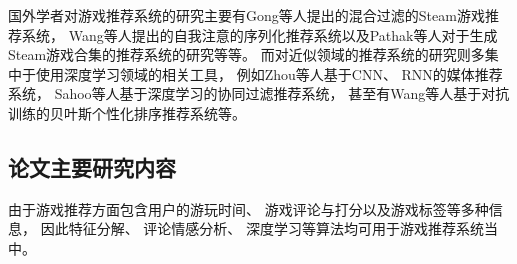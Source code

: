 国外学者对游戏推荐系统的研究主要有Gong等人\cite{gongHybridRecommenderSystem2020}提出的混合过滤的Steam游戏推荐系统，
Wang\cite{kangSelfAttentiveSequentialRecommendation2018}等人提出的自我注意的序列化推荐系统以及Pathak\cite{pathakGeneratingPersonalizingBundle2017}等人对于生成Steam游戏合集的推荐系统的研究等等。
而对近似领域的推荐系统的研究则多集中于使用深度学习领域的相关工具，
例如Zhou\cite{zhouCNNRNNBasedIntelligent2021}等人基于CNN、
RNN的媒体推荐系统，
Sahoo\cite{sahooDeepRecoDeepLearning2019}等人基于深度学习的协同过滤推荐系统，
甚至有Wang\cite{wangAdversarialTrainingBasedMean2020}等人基于对抗训练的贝叶斯个性化排序推荐系统等。

\subsection{论文主要研究内容}

由于游戏推荐方面包含用户的游玩时间、
游戏评论与打分以及游戏标签等多种信息，
因此特征分解、
评论情感分析、
深度学习等算法均可用于游戏推荐系统当中。
